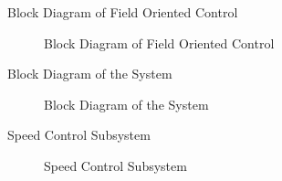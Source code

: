 


\begin{frame}{}
	\maketitle
\end{frame}

\begin{frame}{Block Diagram of Field Oriented Control}
	\begin{figure}
		\centering

		\caption{Block Diagram of Field Oriented Control}
	\end{figure}
\end{frame}

\begin{frame}{Block Diagram of the System}
	\begin{figure}
		\centering

		\caption{Block Diagram of the System}
	\end{figure}
\end{frame}

\begin{frame}{Speed Control Subsystem}
	\begin{figure}
		\centering

		\caption{Speed Control Subsystem}
	\end{figure}
\end{frame}

